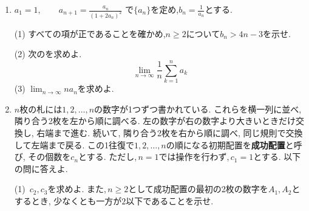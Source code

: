 \begin{enumerate}[label=\textbf{問\arabic*.},leftmargin=3.8em,format=\bookitemlink{practice-entrance}{problem}{answer}]
                とする.
                \par\noindent
                (1) $I_1,I_2$を求めよ.
                \par\noindent
                (2) $n\geq3$について$\,I_n$と$I_{n-2}$の関係式を求め,\,$I_3$を計算せよ.
                \par\noindent
                (3) 座標空間において,原点を頂点とし,平面$z=2$上の半径$2$の円を底面とする円錐を考える.
                その内部と表面は,
                \[
                 0\leq z\leq2,\qquad x^2+y^2\leq z^2
                \]
                で表される.この円錐のうち$x\geq1$を満たす部分の体積を求めよ.
                \par{}
          \item $\displaystyle a_1=1,\qquad
                a_{n+1}=\frac{a_n}{(1+2a_n)^2}$
                で$\{a_n\}$を定め,$\displaystyle b_n=\frac{1}{a_n}$とする.
                \par\noindent
                (1) すべての項が正であることを確かめ,$n\geq2$について$b_n>4n-3$を示せ.
                \par\noindent
                (2) 次のを求めよ.
                \[
                 \lim_{n\to\infty}\frac1n\sum_{k=1}^n a_k
                \]
                (3) $\displaystyle\lim_{n\to\infty}na_n$を求めよ.
                \par{}
          \item $n$枚の札には$1,2,\ldots,n$の数字が1つずつ書かれている.
                これらを横一列に並べ, 隣り合う2枚を左から順に調べる.
                左の数字が右の数字より大きいときだけ交換し, 右端まで進む.
                続いて, 隣り合う2枚を右から順に調べ, 同じ規則で交換して左端まで戻る.
                この1往復で$1,2,\ldots,n$の順になる初期配置を\textbf{成功配置}と呼び, その個数を$c_n$とする.
                ただし,\,$n=1$では操作を行わず,\,$c_1=1$とする. 以下の問に答えよ.

                \smallskip
                \noindent (1)~$c_2,c_3$を求めよ. また,\,$n\ge2$として成功配置の最初の2枚の数字を$A_1,A_2$とするとき,
                少なくとも一方が$2$以下であることを示せ.


\end{enumerate}

